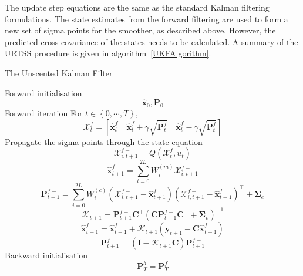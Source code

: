 \documentclass[12pt]{iopart}		%
\begin{document}
The update step equations are the same as the standard Kalman filtering formulations. The state estimates from the forward filtering are used to form a new set of sigma points for the smoother, as described above. However, the predicted cross-covariance of the states needs to be calculated. A summary of the URTSS procedure is given in algorithm~\ref{UKFAlgorithm}.
\begin{algorithm}
\caption{The Unscented Kalman Filter}\label{UKFAlgorithm}
\begin{algorithmic}[1]
\State Forward initialisation
\begin{equation*}
\hat{\mathbf x}_0, \mathbf P_0
\end{equation*}
\State Forward iteration
For $t \in \left\lbrace 0,\cdots, T\right\rbrace $,
\begin{equation*}
\mathcal X_t^f=[\hat{\mathbf x}_t^f \quad \hat{\mathbf x}_t^f+\gamma\sqrt{\mathbf P_t^f} \quad \hat{\mathbf x}_t^{f}-\gamma\sqrt{\mathbf P_t^f}]
\end{equation*}
Propagate the sigma points through the state equation
\begin{equation}
\mathcal X_{i,t+1}^{f-}=Q(\mathcal X_t^f,u_t)
\end{equation}
\begin{equation*}
 \hat{\mathbf x}_{t+1}^{f-}=\sum_{i=0}^{2L} W_i^{(m)}\mathcal X_{i,t+1}^{f-}
\end{equation*}
\begin{equation*}
 \mathbf P_{t +1}^{f-}=\sum_{i=0}^{2L} W_i^{(c)}(\mathcal X_{i,t+1}^{f-}-\hat{\mathbf x}_{t +1}^{f-})(\mathcal X_{i,t+1}^{f-}-\hat{\mathbf x}_{t +1}^{f-})^\top+\boldsymbol \Sigma_e
\end{equation*}
\begin{equation*}
\mathcal K_{t+1}=\mathbf P_{t +1}^{f-}\mathbf C ^\top(\mathbf C \mathbf P_{t +1}^{f-}\mathbf C ^\top+\boldsymbol \Sigma_v)^{-1}
\end{equation*}
\begin{equation*}
\hat{\mathbf x}_{t+1}^{f}=\hat{\mathbf x}_{t+1}^{f-}+\mathcal K_{t+1}(\mathbf y_{t+1}-\mathbf C\hat{\mathbf x}_{t +1}^{f-})
\end{equation*}
\begin{equation*}
 \mathbf P_{t+1}^f=(\mathbf I - \mathcal K_{t+1}\mathbf C)\mathbf P_{t +1}^{f-}
\end{equation*}
\State Backward initialisation
\begin{equation}
 \mathbf P_T^b= \mathbf P_T^f
\end{equation}

\end{algorithmic}
\end{algorithm}
\end{document}
